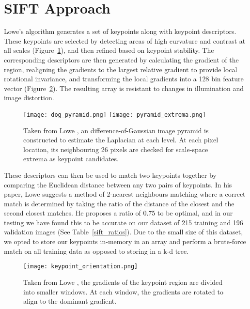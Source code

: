 \section{SIFT Approach}
\label{sift}

Lowe's algorithm generates a set of keypoints along with keypoint descriptors.  These keypoints are selected by detecting areas of high curvature and contrast at all scales (Figure~\ref{sift_scales}), and then refined based on keypoint stability. The corresponding descriptors are then generated by calculating the gradient of the region, realigning the gradients to the largest relative gradient to provide local rotational invariance, and transforming the local gradients into a 128 bin feature vector (Figure~\ref{sift_kp_gradient}). The resulting array is resistant to changes in illumination and image distortion.

\begin{figure}[h]
\texttt{[image: dog\_pyramid.png]}
\texttt{[image: pyramid\_extrema.png]}
\centering
\caption{Taken from Lowe \cite{SIFT}, an difference-of-Gaussian image pyramid is constructed to estimate the Laplacian at each level. At each pixel location, its neighbouring 26 pixels are checked for scale-space extrema as keypoint candidates.}
\label{sift_scales}
\end{figure}

These descriptors can then be used to match two keypoints together by comparing the Euclidean distance between any two pairs of keypoints. In his paper, Lowe suggests a method of 2-nearest neighbours matching where a correct match is determined by taking the ratio of the distance of the closest and the second closest matches. He proposes a ratio of 0.75 to be optimal, and in our testing we have found this to be accurate on our dataset of 215 training and 196 validation images (See Table~\ref{sift_ratios}). Due to the small size of this dataset, we opted to store our keypoints in-memory in an array and perform a brute-force match on all training data as opposed to storing in a k-d tree.

\begin{figure}[h]
\texttt{[image: keypoint\_orientation.png]}
\centering
\caption{Taken from Lowe \cite{SIFT}, the gradients of the keypoint region are divided into smaller windows. At each window, the gradients are rotated to align to the dominant gradient.}
\label{sift_kp_gradient}
\end{figure}

